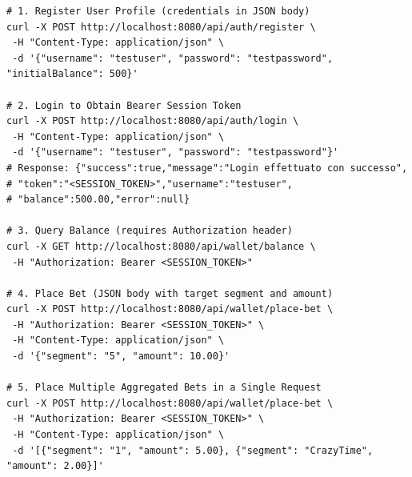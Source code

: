 \documentclass[12pt,a4paper]{article}
\begin{document}
\begin{lstlisting}[basicstyle=\ttfamily, breaklines=true]
# 1. Register User Profile (credentials in JSON body)
curl -X POST http://localhost:8080/api/auth/register \
 -H "Content-Type: application/json" \
 -d '{"username": "testuser", "password": "testpassword", "initialBalance": 500}'

# 2. Login to Obtain Bearer Session Token
curl -X POST http://localhost:8080/api/auth/login \
 -H "Content-Type: application/json" \
 -d '{"username": "testuser", "password": "testpassword"}'
# Response: {"success":true,"message":"Login effettuato con successo",
# "token":"<SESSION_TOKEN>","username":"testuser",
# "balance":500.00,"error":null}

# 3. Query Balance (requires Authorization header)
curl -X GET http://localhost:8080/api/wallet/balance \
 -H "Authorization: Bearer <SESSION_TOKEN>"

# 4. Place Bet (JSON body with target segment and amount)
curl -X POST http://localhost:8080/api/wallet/place-bet \
 -H "Authorization: Bearer <SESSION_TOKEN>" \
 -H "Content-Type: application/json" \
 -d '{"segment": "5", "amount": 10.00}'

# 5. Place Multiple Aggregated Bets in a Single Request
curl -X POST http://localhost:8080/api/wallet/place-bet \
 -H "Authorization: Bearer <SESSION_TOKEN>" \
 -H "Content-Type: application/json" \
 -d '[{"segment": "1", "amount": 5.00}, {"segment": "CrazyTime", "amount": 2.00}]'
\end{lstlisting}
\end{document}
